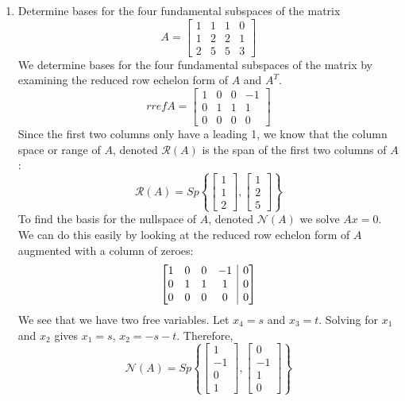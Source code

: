\documentclass[12pt]{article}
\makeatletter
\numberwithin{equation}{section}
\newenvironment{proof}[1][Proof]{\textbf{#1.} }{\ \rule{0.5em}{0.5em}}
\newenvironment{amatrix}[1]{%
  \left[\begin{array}{@{}*{#1}{c}|c@{}}
}{%
  \end{array}\right]
}
\makeatother
\begin{document}
\begin{enumerate}
\begin{enumerate}
\begin{proof}
            \end{proof}
    \end{enumerate}
    \item Determine bases for the four fundamental subspaces of the matrix
    $$A=\left[\begin{array}{cccc} 1&1&1&0\\1&2&2&1\\2&5&5&3\end{array}\right]$$
    We determine bases for the four fundamental subspaces of the matrix by examining the reduced row echelon form of $A$ and $A^T$.
    $$rref{A}=\left[\begin{array}{cccc}1&0&0&-1\\0&1&1&1\\0&0&0&0\end{array}\right]$$
    Since the first two columns only have a leading 1, we know that the column space or range of $A$, denoted $\mathcal{R}(A)$ is the span of the first two columns of $A$:
    $$\mathcal{R}(A)=Sp\left\{\left[\begin{array}{c}1\\1\\2\end{array}\right],\left[\begin{array}{c}1\\2\\5\end{array}\right]\right\}$$
    To find the basis for the nullspace of $A$, denoted $\mathcal{N}(A)$ we solve $Ax=0$. We can do this easily by looking at the reduced row echelon form of $A$ augmented with a column of zeroes:
    $$\begin{amatrix}{4}1&0&0&-1&0\\0&1&1&1&0\\0&0&0&0&0\end{amatrix}$$
    We see that we have two free variables. Let $x_4=s$ and $x_3=t$. Solving for $x_1$ and $x_2$ gives $x_1=s$, $x_2=-s-t$. Therefore,
    $$\mathcal{N}(A)=Sp\left\{\left[\begin{array}{c}1\\-1\\0\\1\end{array}\right],\left[\begin{array}{c}0\\-1\\1\\0\end{array}\right]\right\}$$

\end{enumerate}
\end{document}
